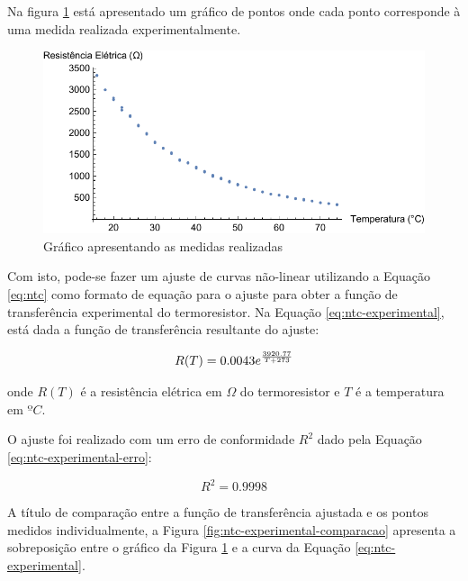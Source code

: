 \documentclass[a4paper]{instrumentacao}
\begin{document}

Na figura \ref{fig:ntc-medidas} está apresentado um gráfico de pontos onde cada ponto corresponde à uma medida realizada experimentalmente.

\begin{figure}[H]
\center
\includegraphics[width=\textwidth]{NTC-MeasurementsPlot.pdf}
\caption{Gráfico apresentando as medidas realizadas}
\label{fig:ntc-medidas}
\end{figure}

Com isto, pode-se fazer um ajuste de curvas não-linear utilizando a Equação \ref{eq:ntc} como formato de equação para o ajuste para obter a função de transferência experimental do termoresistor. Na Equação \ref{eq:ntc-experimental}, está dada a função de transferência resultante do ajuste:

\begin{equation} \large
	R(T) = 0.0043 e^{\frac{3920.77}{T+273}}
	\label{eq:ntc-experimental}
\end{equation}

\noindent onde $R(T)$ é a resistência elétrica em $\Omega$ do termoresistor e $T$ é a temperatura em $ºC$.

O ajuste foi realizado com um erro de conformidade $R^2$ dado pela Equação \ref{eq:ntc-experimental-erro}:

\begin{equation}
	R^2 = 0.9998
	\label{eq:ntc-experimental-erro}
\end{equation}

A título de comparação entre a função de transferência ajustada e os pontos medidos individualmente, a Figura \ref{fig:ntc-experimental-comparacao} apresenta a sobreposição entre o gráfico da Figura \ref{fig:ntc-medidas} e a curva da Equação \ref{eq:ntc-experimental}.
\end{document}
